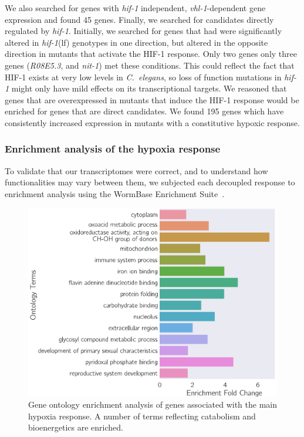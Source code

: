 \documentclass[10pt, onecolumn]{article}
\newcommand{\cel}{\emph{C.~elegans}}
\newcommand{\gene}[1]{\emph{#1}}
\newcommand{\hif}{\emph{\mbox{hif-1}}(lf)}
\newcommand{\hifp}{HIF-1}
\newcommand{\vhltargets}{45} %
\newcommand{\hiftargets}{195}
\begin{document}
We also searched for genes with \gene{hif-1} independent, \gene{vhl-1}-dependent gene
expression and found \vhltargets{} genes.
Finally, we searched for candidates directly regulated by \gene{hif-1}. Initially, we
searched for genes that had were significantly altered in \hif{} genotypes in one
direction, but altered in the opposite direction in mutants that activate the
\hifp{} response. Only two genes
only three genes (\emph{R08E5.3}, and \emph{nit-1}) met these
conditions. This could reflect the fact that \hifp{} exists at very low
levels in \cel{}, so loss of function mutations in \gene{hif-1} might only have
mild effects on its transcriptional targets. We reasoned that genes
that are overexpressed in mutants that induce the \hifp{} response would be enriched
for genes that are direct candidates.  We found \hiftargets{}  genes which have
consistently increased expression in mutants with a constitutive hypoxic response.


\subsubsection*{Enrichment analysis of the hypoxia response}
\label{sub:ea_hypoxia}
To validate that our transcriptomes were correct, and to understand how
functionalities may vary between them, we subjected each decoupled response to
enrichment analysis using the WormBase Enrichment Suite~\cite{Angeles-Albores2016,
Angeles-Albores2016b}.

\begin{figure}[tbhp]
\centering
\includegraphics[width=.5\linewidth]{../figs/hypoxia_response_gea.pdf}
\caption{
Gene ontology enrichment analysis of genes associated with the main hypoxia response.
A number of terms reflecting catabolism and bioenergetics are enriched.
}
\label{fig:hyp_gea}
\end{figure}
\end{document}

